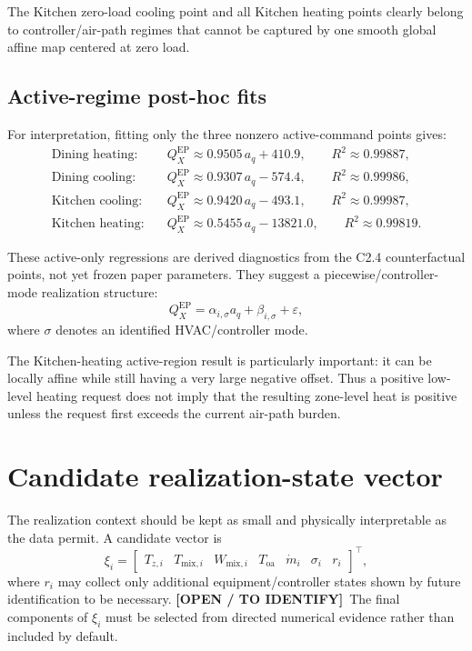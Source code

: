 \documentclass[11pt]{article}
\newcommand{\mdot}{\dot m}
\newcommand{\OpenItem}{\textbf{[OPEN / TO IDENTIFY]}}
\begin{document}
The Kitchen zero-load cooling point and all Kitchen heating points clearly
belong to controller/air-path regimes that cannot be captured by one smooth
global affine map centered at zero load.

\subsection{Active-regime post-hoc fits}

For interpretation, fitting only the three nonzero active-command points gives:
\begin{align}
\text{Dining heating:}\quad
&Q_X^{\mathrm{EP}}
\approx
0.9505\,a_q + 410.9,
\qquad R^2\approx0.99887,
\\
\text{Dining cooling:}\quad
&Q_X^{\mathrm{EP}}
\approx
0.9307\,a_q - 574.4,
\qquad R^2\approx0.99986,
\\
\text{Kitchen cooling:}\quad
&Q_X^{\mathrm{EP}}
\approx
0.9420\,a_q - 493.1,
\qquad R^2\approx0.99987,
\\
\text{Kitchen heating:}\quad
&Q_X^{\mathrm{EP}}
\approx
0.5455\,a_q - 13821.0,
\qquad R^2\approx0.99819.
\end{align}

These active-only regressions are derived diagnostics from the C2.4
counterfactual points, not yet frozen paper parameters.  They suggest a
piecewise/controller-mode realization structure:
\begin{equation}
Q_X^{\mathrm{EP}}
=
\alpha_{i,\sigma} a_q
+
\beta_{i,\sigma}
+
\varepsilon,
\label{eq:piecewise-affine}
\end{equation}
where $\sigma$ denotes an identified HVAC/controller mode.

The Kitchen-heating active-region result is particularly important: it can be
locally affine while still having a very large negative offset.  Thus a
positive low-level heating request does not imply that the resulting zone-level
heat is positive unless the request first exceeds the current air-path burden.

\section{Candidate realization-state vector}

The realization context should be kept as small and physically interpretable as
the data permit.  A candidate vector is
\begin{equation}
\xi_i
=
\begin{bmatrix}
T_{z,i} &
T_{\mathrm{mix},i} &
W_{\mathrm{mix},i} &
T_{\mathrm{oa}} &
\mdot_i &
\sigma_i &
r_i
\end{bmatrix}^{\top},
\label{eq:xi-candidate}
\end{equation}
where $r_i$ may collect only additional equipment/controller states shown by
future identification to be necessary.  \OpenItem\ The final components of
$\xi_i$ must be selected from directed numerical evidence rather than included
by default.
\end{document}
